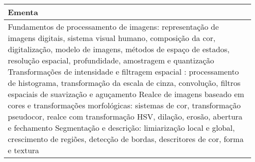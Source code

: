 \begin{quadro}[ht!]
\begin{tabular}{|p{3cm} p{2cm} p{3cm} p{2cm} p{3cm} p{2cm}|}
\multicolumn{6}{|p{15cm}|}{\cellcolor{blue1} Ementa} \\\hline
\hline\multicolumn{6}{|p{15cm}|}{\scriptsize Fundamentos de processamento de imagens: representação de imagens digitais, sistema visual humano, composição da cor, digitalização, modelo de imagens, métodos de espaço de estados, resolução espacial, profundidade, amostragem e quantização Transformações de intensidade e filtragem espacial : processamento de histograma, transformação da escala de cinza, convolução, filtros espaciais de suavização e aguçamento Realce de imagens baseado em cores e transformações morfológicas: sistemas de cor, transformação pseudocor, realce com transformação HSV, dilação, erosão, abertura e fechamento Segmentação e descrição: limiarização local e global, crescimento de regiões, detecção de bordas, descritores de cor, forma e textura}\\\hline
\hline
	\end{tabular}
\end{quadro}
